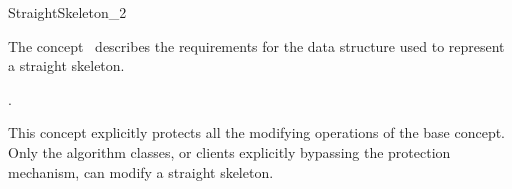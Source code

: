 
\begin{ccRefConcept}{StraightSkeleton_2}


\ccDefinition

The concept \ccRefName\ describes the requirements for the data structure used to represent a straight skeleton.

\ccRefines
{}

\ccTypes
  \ccGlue
  \ccGlue

\ccHasModels

.

This concept explicitly protects all the modifying operations of the base  concept. Only the algorithm classes, or clients explicitly bypassing the protection mechanism, can modify a straight skeleton.
 
\end{ccRefConcept}

